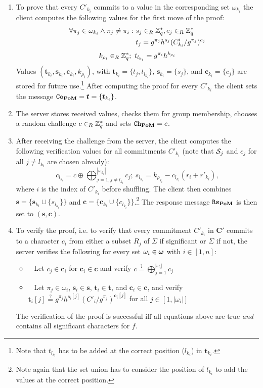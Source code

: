\begin{enumerate}
  \item To prove that every $C'_{{k_i}}$ commits to a value in the corresponding set $\omega_{{k_i}}$ the client computes the following values for the first move of the proof:
    \begin{align*}
      \forall \pi_j\in\omega_{{k_i}} \wedge \pi_j\not=\pi_i :~& s_j\in_R\mathbb{Z}^\ast_q, c_j\in_R\mathbb{Z}^\ast_q \\
      & t_j=g^{\pi_j}h^{s_j}(C'_{{k_i}}/g^{\pi_j})^{c_j}
    \end{align*}
    \[
      k_{\rho_i}\in_R\mathbb{Z}^\ast_q;~ t_{l_{k_i}}=g^{\pi_i}h^{k_{\rho_i}}
    \]
    Values $(\bm t_{k_i}, \bm s_{k_i}, \bm c_{k_i}, k_{\rho_i})$, with $\bm t_{k_i}=\{t_j, t_{l_{k_i}}\}$, $\bm s_{k_i}=\{s_j\}$, and $\bm c_{k_i}=\{c_j\}$ are stored for future use.\footnote{Note that $t_{l_{k_i}}$ has to be added at the correct position ($l_{k_i}$) in $\bm t_{k_i}$.}
    After computing the proof for every $C'_{k_i}$ the client sets the message $\mathtt{Co}_\mathsf{\bf PoM}=\bm t = \{\bm t_{k_i}\}$.
    
  \item The server stores received values, checks them for group membership, chooses a random challenge $c\in_R\mathbb{Z}^\ast_q$ and sets $\mathtt{Ch}_\mathsf{\bf PoM}=c$.
  
  \item After receiving the challenge \Client from the server, the client computes the following verification values for all commitments $C'_{{k_i}}$ (note that $\mathcal{S}_j$ and $c_j$ for all $j\not= l_{k_i}$ are chosen already):
    \[
      c_{l_{k_i}}=c\oplus \bigoplus_{j=1,j\not=l_{k_i}}^{|\omega_{k_i}|} c_j;~ s_{l_{k_i}}=k_{\rho_{k_i}} - c_{l_{k_i}}(r_{i}+r'_{k_i}),
    \]
    where $i$ is the index of $C'_{k_i}$ before shuffling.
    The client then combines $\bm s = \{\bm s_{k_i} \cup \{s_{l_{k_i}}\}\}$ and $\bm c = \{\bm c_{k_i} \cup \{c_{l_{k_i}}\}\}$.\footnote{Note again that the set union has to consider the position of $l_{k_i}$ to add the values at the correct position.}
    The response message $\mathtt{Rs}_\mathsf{\bf PoM}$ is then set to $(\bm s, \bm c)$.
  
  \item To verify the proof, i.e. to verify that every commitment $C'_{k_i}$ in $\bm C'$ commits to a character $c_i$ from either a subset $R_j$ of $\Sigma$ if significant or $\Sigma$ if not, the server verifies the following for every set $\omega_{i} \in \boldsymbol{\mathbf{\omega}}$ with $i\in[1,n]$: %
    \begin{itemize}
      \item~ Let $c_j\in\bm c_i$ for $\bm c_i\in\bm c$ and verify
            $c\stackrel{?}{=}\bigoplus_{j=1}^{|\omega_i|}c_j$
      \item~ Let $\pi_j\in\omega_{i}$, $\bm s_i \in \bm s$, $\bm t_i\in \bm t$, and $\bm c_i \in \bm c$, and verify
            $\displaystyle \bm t_{i}[j]\stackrel{?}{=}g^{\pi_j}h^{\bm s_i[j]}(C'_i/g^{\pi_j})^{\bm c_i[j]}$
            for all $j\in[1,|\omega_{i}|]$
    \end{itemize}
    The verification of the proof is successful iff all equations above are true \emph{and} \vect{\omega} contains all significant characters for $f$.
\end{enumerate}

